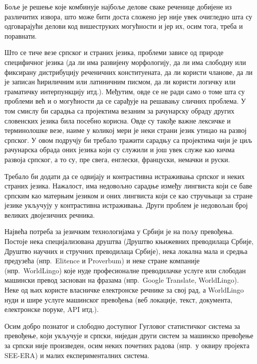 \begin{multicols}{2}
Боље је решење које комбинује најбоље делове сваке реченице добијене из различитих извора, што може бити доста сложено јер није увек очигледно шта су одговарајући делови код вишеструких могућности и јер их, осим тога, треба и поравнати. 


Што се тиче везе српског и страних језика, проблеми зависе од природе специфичног језика (да ли има развијену морфологију, да ли има слободну или фиксирану дистрибуцију реченичних конституената, да ли користи чланове, да ли је записан ћириличним или латиничним писмом, да ли користи логичку или граматичку интерпункцију итд.). Међутим, овде се не ради само о томе шта су проблеми већ и о могућности да се сарађује на решавању сличних проблема. У том смислу би сарадња са пројектима везаним за рачунарску обраду других словенских језика била посебно корисна. Овде су такође важне лексичке и терминолошке везе, наиме у коликој мери је неки страни језик утицао на развој српског. У овом подручју би требало тражити сарадњу са пројектима чији је циљ рачунарска обрада оних језика који су служили и још увек служе као кичма развоја српског, а то су, пре свега, енглески, француски, немачки и руски.

Требало би додати да се одвијају и контрастивна истраживања српског и неких страних језика. Нажалост, има недовољно сарадње између лингвиста који се баве српским као матерњим језиком и оних лингвиста који се као стручњаци за стране језике укључују у контрастивна истраживања. Други проблем је недовољан број великих двојезичних речника. 

Највећа потреба за језичким технологијама у Србији је на пољу превођења. Постоје нека специјализована друштва (Друштво књижевних преводилаца Србије, Друштво научних и стручних преводилаца Србије), нека локална мала и средња предузећа (нпр.~Elitence и Proverbum) и неке стране компаније (нпр.~World\-Lingo) које нуде професионалне преводилачке услуге или слободан машински превод заснован на фразама (нпр.~Google Translate, World\-Lingo). Неке од њих користе власничке електронске речнике за свој рад, а World\-Lingo нуди и шире услуге машинског превођења (веб локације, текст, документа, електронске поруке, API итд.).

Осим добро познатог и слободно доступног Гугловог статистичког система за превођење, који укључује и српски, ниједан други систем за машинско превођење за српски није произведен, осим неких почетних радова (нпр.~у оквиру пројекта SEE-ERA) и малих експерименталних система.


\end{multicols}
